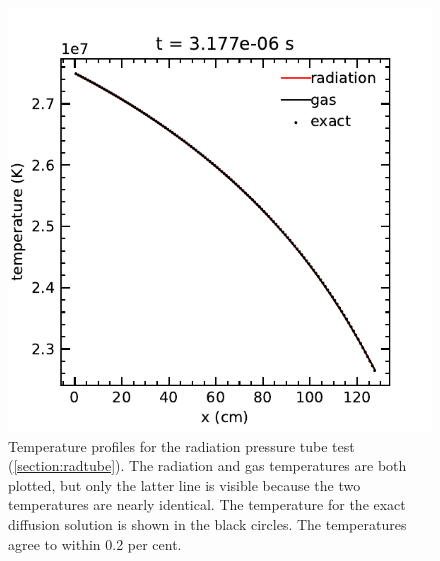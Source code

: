 \documentclass[fleqn,usenatbib]{mnras}
\begin{document}
\begin{figure}
    \includegraphics[width=\columnwidth]{radiation_pressure_tube.pdf}
    \caption{Temperature profiles for the radiation pressure tube test (\autoref{section:radtube}). The radiation and gas temperatures are both plotted, but only the latter line is visible because the two temperatures are nearly identical. The temperature for the exact diffusion solution is shown in the black circles. The temperatures agree to within 0.2 per cent.}
    \label{fig:radiation_pressure_tube}
\end{figure}
\end{document}
